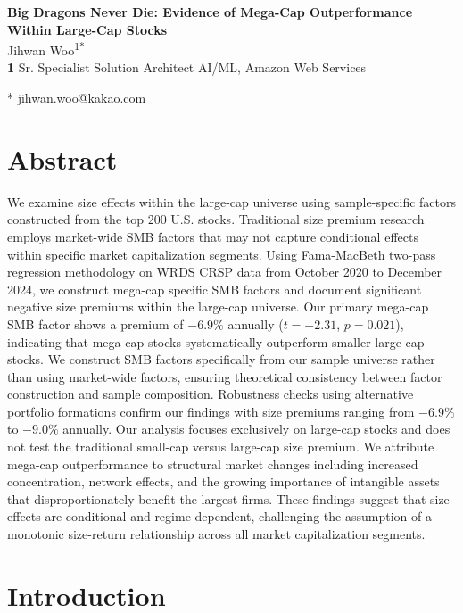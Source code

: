 \documentclass[10pt,letterpaper]{article}
\begin{document}
\vspace*{0.2in}

\begin{flushleft}
{\Large
\textbf{Big Dragons Never Die: Evidence of Mega-Cap Outperformance Within Large-Cap Stocks}
}
\newline
\\
Jihwan Woo\textsuperscript{1*}
\\
\bigskip
\textbf{1} Sr. Specialist Solution Architect AI/ML, Amazon Web Services
\\
\bigskip

* jihwan.woo@kakao.com

\end{flushleft}

\section*{Abstract}
We examine size effects within the large-cap universe using sample-specific factors constructed from the top 200 U.S. stocks. Traditional size premium research employs market-wide SMB factors that may not capture conditional effects within specific market capitalization segments. Using Fama-MacBeth two-pass regression methodology on WRDS CRSP data from October 2020 to December 2024, we construct mega-cap specific SMB factors and document significant negative size premiums within the large-cap universe. Our primary mega-cap SMB factor shows a premium of $-6.9\%$ annually ($t=-2.31$, $p=0.021$), indicating that mega-cap stocks systematically outperform smaller large-cap stocks. We construct SMB factors specifically from our sample universe rather than using market-wide factors, ensuring theoretical consistency between factor construction and sample composition. Robustness checks using alternative portfolio formations confirm our findings with size premiums ranging from $-6.9\%$ to $-9.0\%$ annually. Our analysis focuses exclusively on large-cap stocks and does not test the traditional small-cap versus large-cap size premium. We attribute mega-cap outperformance to structural market changes including increased concentration, network effects, and the growing importance of intangible assets that disproportionately benefit the largest firms. These findings suggest that size effects are conditional and regime-dependent, challenging the assumption of a monotonic size-return relationship across all market capitalization segments.

\linenumbers

\section*{Introduction}
\end{document}
